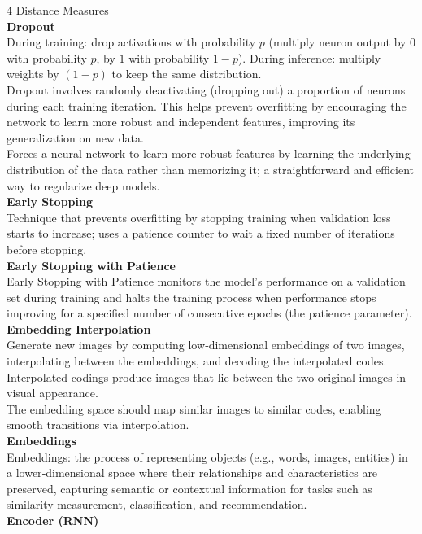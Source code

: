 \documentclass[8pt]{extarticle}
\begin{document}
\begin{multicols}{4}
Distance Measures\\
\vspace{2pt}\textbf{Dropout}\\
During training: drop activations with probability $p$ (multiply neuron output by $0$ with probability $p$, by $1$ with probability $1-p$). During inference: multiply weights by $(1-p)$ to keep the same distribution.\\
Dropout involves randomly deactivating (dropping out) a proportion of neurons during each training iteration. This helps prevent overfitting by encouraging the network to learn more robust and independent features, improving its generalization on new data.\\
Forces a neural network to learn more robust features by learning the underlying distribution of the data rather than memorizing it; a straightforward and efficient way to regularize deep models.\\
\vspace{2pt}\textbf{Early Stopping}\\
Technique that prevents overfitting by stopping training when validation loss starts to increase; uses a patience counter to wait a fixed number of iterations before stopping.\\
\vspace{2pt}\textbf{Early Stopping with Patience}\\
Early Stopping with Patience monitors the model’s performance on a validation set during training and halts the training process when performance stops improving for a specified number of consecutive epochs (the patience parameter).\\
\vspace{2pt}\textbf{Embedding Interpolation}\\
Generate new images by computing low‑dimensional embeddings of two images, interpolating between the embeddings, and decoding the interpolated codes.\\
Interpolated codings produce images that lie between the two original images in visual appearance.\\
The embedding space should map similar images to similar codes, enabling smooth transitions via interpolation.\\
\vspace{2pt}\textbf{Embeddings}\\
Embeddings: the process of representing objects (e.g., words, images, entities) in a lower‑dimensional space where their relationships and characteristics are preserved, capturing semantic or contextual information for tasks such as similarity measurement, classification, and recommendation.\\
\vspace{2pt}\textbf{Encoder (RNN)}\\


\end{multicols}
\end{document}
